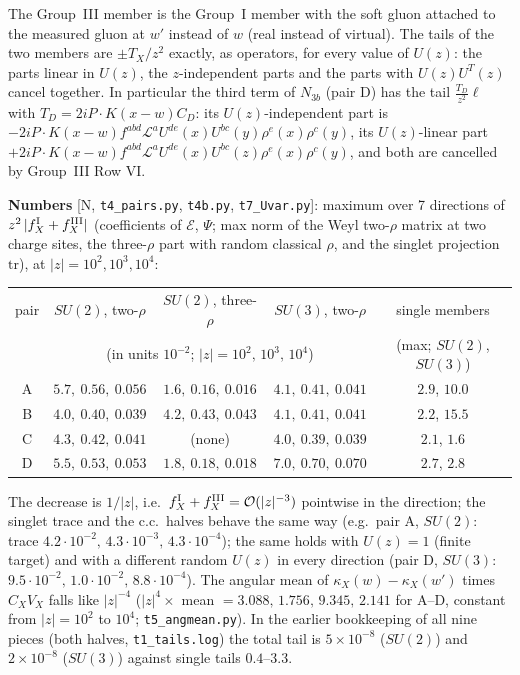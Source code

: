 The Group~III member is the Group~I member with the soft gluon attached to the measured gluon at $w'$ instead of $w$ (real instead of virtual). The tails of the two members are $\pm T_{X}/z^{2}$ exactly, as operators, for every value of $U(z)$: the parts linear in $U(z)$, the $z$-independent parts and the parts with $U(z)U^{T}(z)$ cancel together. In particular the third term of $N_{3b}$ (pair D) has the tail $\frac{T_{D}}{z^{2}}\ell$ with $T_{D}=2iP\cdot K(x-w)C_{D}$: its $U(z)$-independent part is $-2iP\!\cdot\!K(x-w)f^{abd}\mathcal{L}^{a}U^{de}(x)U^{bc}(y)\rho^{e}(x)\rho^{c}(y)$, its $U(z)$-linear part $+2iP\!\cdot\!K(x-w)f^{abd}\mathcal{L}^{a}U^{de}(x)U^{bc}(z)\rho^{e}(x)\rho^{c}(y)$, and both are cancelled by Group~III Row VI.

\noindent\textbf{Numbers} [N, \texttt{t4\_pairs.py}, \texttt{t4b.py}, \texttt{t7\_Uvar.py}]: maximum over 7 directions of $z^{2}\,|f^{\rm I}_{X}+f^{\rm III}_{X}|$ (coefficients of $\mathcal{E}$, $\Psi$; max norm of the Weyl two-$\rho$ matrix at two charge sites, the three-$\rho$ part with random classical $\rho$, and the singlet projection $\mathrm{tr}$), at $|z|=10^{2},10^{3},10^{4}$:
\begin{center}
\renewcommand{\arraystretch}{1.25}\small
\begin{tabular}{|c|c|c|c|c|}\hline
pair & $SU(2)$, two-$\rho$ & $SU(2)$, three-$\rho$ & $SU(3)$, two-$\rho$ & single members\\
 & \multicolumn{3}{c|}{(in units $10^{-2}$; $|z|=10^{2},\,10^{3},\,10^{4}$)} & (max; $SU(2)$, $SU(3)$)\\\hline
A & $5.7,\ 0.56,\ 0.056$ & $1.6,\ 0.16,\ 0.016$ & $4.1,\ 0.41,\ 0.041$ & $2.9$, $10.0$\\
B & $4.0,\ 0.40,\ 0.039$ & $4.2,\ 0.43,\ 0.043$ & $4.1,\ 0.41,\ 0.041$ & $2.2$, $15.5$\\
C & $4.3,\ 0.42,\ 0.041$ & (none) & $4.0,\ 0.39,\ 0.039$ & $2.1$, $1.6$\\
D & $5.5,\ 0.53,\ 0.053$ & $1.8,\ 0.18,\ 0.018$ & $7.0,\ 0.70,\ 0.070$ & $2.7$, $2.8$\\\hline
\end{tabular}
\end{center}
The decrease is $1/|z|$, i.e.\ $f^{\rm I}_{X}+f^{\rm III}_{X}={\cal O}(|z|^{-3})$ pointwise in the direction; the singlet trace and the c.c.\ halves behave the same way (e.g.\ pair A, $SU(2)$: trace $4.2\cdot10^{-2},\,4.3\cdot10^{-3},\,4.3\cdot10^{-4}$); the same holds with $U(z)=1$ (finite target) and with a different random $U(z)$ in every direction (pair D, $SU(3)$: $9.5\cdot10^{-2},\,1.0\cdot10^{-2},\,8.8\cdot10^{-4}$). The angular mean of $\kappa_{X}(w)-\kappa_{X}(w')$ times $C_{X}V_{X}$ falls like $|z|^{-4}$ ($|z|^{4}\times$ mean $=3.088,\,1.756,\,9.345,\,2.141$ for A--D, constant from $|z|=10^{2}$ to $10^{4}$; \texttt{t5\_angmean.py}). In the earlier bookkeeping of all nine pieces (both halves, \texttt{t1\_tails.log}) the total tail is $5\times10^{-8}$ ($SU(2)$) and $2\times10^{-8}$ ($SU(3)$) against single tails $0.4$--$3.3$.


